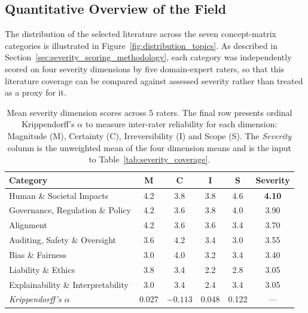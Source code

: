 

    \subsection*{Quantitative Overview of the Field}\label{subsec:results_quantitative}

    The distribution of the selected literature across the seven concept-matrix categories is illustrated in Figure~\ref{fig:distribution_topics}. As described in Section~\ref{sec:severity_scoring_methodology}, each category was independently scored on four severity dimensions by five domain-expert raters, so that this literature coverage can be compared against assessed severity rather than treated as a proxy for it.

    \begin{table}[h]
        \centering
        \small
        \caption{Mean severity dimension scores across 5 raters. The final row presents ordinal Krippendorff's $\alpha$ to measure inter-rater reliability for each dimension: Magnitude (M), Certainty (C), Irreversibility (I) and Scope (S). The \textit{Severity} column is the unweighted mean of the four dimension means and is the input to Table~\ref{tab:severity_coverage}.}
        \label{tab:rater_scores_summary}
        \begin{tabular}{|l|c|c|c|c|c|}
            \hline
            \textbf{Category} & \textbf{M} & \textbf{C} & \textbf{I} & \textbf{S} & \textbf{Severity} \\
            \hline
            Human \& Societal Impacts         & 4.2 & 3.8 & 3.8 & 4.6 & \textbf{4.10} \\
            Governance, Regulation \& Policy  & 4.2 & 3.6 & 3.8 & 4.0 & 3.90 \\
            Alignment                         & 4.2 & 3.6 & 3.6 & 3.4 & 3.70 \\
            Auditing, Safety \& Oversight     & 3.6 & 4.2 & 3.4 & 3.0 & 3.55 \\
            Bias \& Fairness                  & 3.0 & 4.0 & 3.2 & 3.4 & 3.40 \\
            Liability \& Ethics               & 3.8 & 3.4 & 2.2 & 2.8 & 3.05 \\
            Explainability \& Interpretability & 3.0 & 3.4 & 2.4 & 3.4 & 3.05 \\
            \hline \hline
            \textit{Krippendorff's $\alpha$}  & 0.027 & $-0.113$ & 0.048 & 0.122 & --- \\
            \hline
        \end{tabular}
    \end{table}

